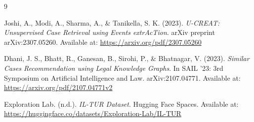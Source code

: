\documentclass{article}
\begin{document}
\begin{thebibliography}{9}

Joshi, A., Modi, A., Sharma, A., \& Tanikella, S. K. (2023). 
\textit{U-CREAT: Unsupervised Case Retrieval using Events extrAcTion}. 
arXiv preprint arXiv:2307.05260. Available at: \url{https://arxiv.org/pdf/2307.05260}

Dhani, J. S., Bhatt, R., Ganesan, B., Sirohi, P., \& Bhatnagar, V. (2023). 
\textit{Similar Cases Recommendation using Legal Knowledge Graphs}. 
In SAIL '23: 3rd Symposium on Artificial Intelligence and Law. arXiv:2107.04771. Available at: \url{https://arxiv.org/pdf/2107.04771v2}

Exploration Lab. (n.d.). \textit{IL-TUR Dataset}. Hugging Face Spaces. Available at: \url{https://huggingface.co/datasets/Exploration-Lab/IL-TUR}

\end{thebibliography}
\end{document}
